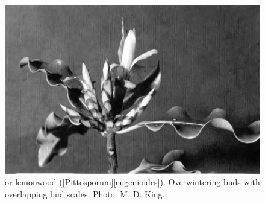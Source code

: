\begin{figure}[!b]
	\begin{minipage}[t]{\textwidth}
		\begin{minipage}[t]{(\textwidth-\fgap) * \real{0.68}}
			\centering
			\includegraphics[width=\textwidth]{graphics/fig_024}
			\caption[Tarata or lemonwood]{ or lemonwood ([Pittosporum][eugenioides]). Overwintering buds with overlapping bud scales. Photo: M. D. King.}%
			\label{fig:24tarata}
		\end{minipage}\hspace{\fgap}%
		\begin{minipage}[t]{(\textwidth-\fgap) * \real{0.32}}
			\centering

\end{minipage}
\end{minipage}
\end{figure}
